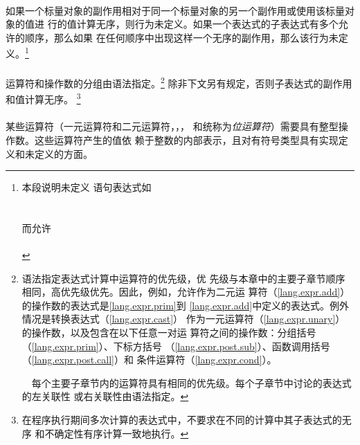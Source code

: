 {\paragraph{}
如果一个标量对象的副作用相对于同一个标量对象的另一个副作用或使用该标量对象的值进
行的值计算无序，则行为未定义。如果一个表达式的子表达式有多个允许的顺序，那么如果
在任何顺序中出现这样一个无序的副作用，那么该行为未定义。\footnote{本段说明未定义
语句表达式如                                                                  \\
\mbox{\hspace{4em}}                                          \\
\mbox{\hspace{4em}}                                           \\
而允许                                                                        \\
\mbox{\hspace{4em}}                                            \\
\mbox{\hspace{4em}}}

\paragraph{}
运算符和操作数的分组由语法指定。\footnote{语法指定表达式计算中运算符的优先级，优
先级与本章中的主要子章节顺序相同，高优先级优先。因此，例如，允许作为二元\tm{+}运
算符（\ref{lang.expr.add}）的操作数的表达式是\ref{lang.expr.prim}到
\ref{lang.expr.add}中定义的表达式。例外情况是转换表达式（\ref{lang.expr.cast}）
作为一元\tm{+}运算符（\ref{lang.expr.unary}）的操作数，以及包含在以下任意一对运
算符之间的操作数：分组括号\tm{()}（\ref{lang.expr.prim}）、下标方括号\tm{[]}
（\ref{lang.expr.post.sub}）、函数调用括号\tm{()}（\ref{lang.expr.post.call}）和
条件运算符（\ref{lang.expr.cond}）。\vspace{0.2cm}

\ \ 每个主要子章节内的运算符具有相同的优先级。每个子章节中讨论的表达式的左关联性
或右关联性由语法指定。} 除非下文另有规定，否则子表达式的副作用和值计算无序。
\footnote{在程序执行期间多次计算的表达式中，不要求在不同的计算中其子表达式的无序
和不确定性有序计算一致地执行。}

\paragraph{}
某些运算符（一元运算符\tm{\~}和二元运算符\tm{\tl{}\tl}，\tm{\tg{}\tg}，\tm{\&}，
\tm{\^}和\tm{|}统称为\textit{位运算符}）需要具有整型操作数。这些运算符产生的值依
赖于整数的内部表示，且对有符号类型具有实现定义和未定义的方面。

}
